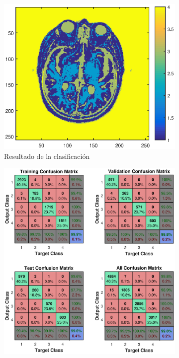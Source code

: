 \documentclass[11pt]{article} %
\begin{document}
\begin{figure}%
	\centering
	\begin{subfigure}[b]{0.435\textwidth}
		\includegraphics[width=\textwidth]{../2_NN/class_leven_32.eps}
		\caption[]{\small Resultado de la clasificación}
		\label{fig:nn:leven:class}
	\end{subfigure}
	\quad
	\begin{subfigure}[b]{0.435\textwidth}
		\includegraphics[width=\textwidth]{../2_NN/conf_leven_32.eps}

\end{subfigure}
\end{figure}
\end{document}
